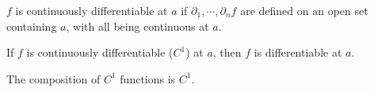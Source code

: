 \begin{definition}[$C^1$]
$f$ is continuously differentiable at $a$ if $\partial_1, \cdots, \partial_n f$ are defined on an open set containing $a$, with all being continuous at $a$.
\end{definition}

\begin{theorem} \label{thm:c1impdiff}
    If $f$ is continuously differentiable ($C^1$) at $a$, then $f$ is differentiable at $a$. 
\end{theorem}

\begin{simplethm} \label{thm:c1composition}
The composition of $C^1$ functions is $C^1$. 
\end{simplethm}

